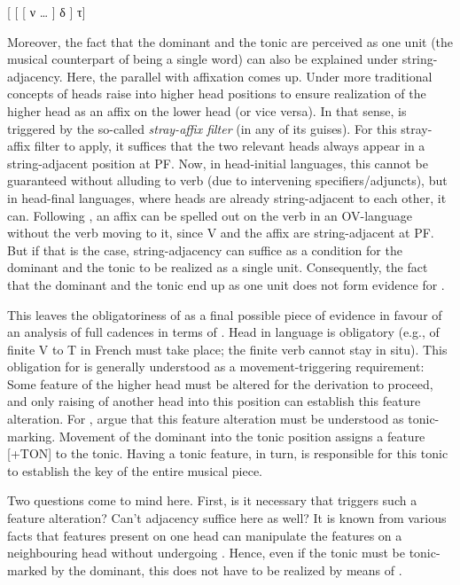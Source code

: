\documentclass[output=paper]{langsci/langscibook}
\begin{document}
\ea\label{bkm:Ref348782802}
    {}[ [ [ ν \dots{} ] δ ] τ]
\z

Moreover, the fact that the dominant and the tonic are perceived as one unit
(the musical counterpart of being a single word) can also be explained under
string-adjacency. Here, the parallel with affixation comes up. Under more
traditional concepts of  heads raise into higher head positions to
ensure realization of the higher head as an affix on the lower head (or vice
versa). In that sense,  is triggered by the so-called
\emph{stray-affix filter} \parencite[cf.][]{Lasnik1981,Lasnik1995b,Baker1988}
(in any of its guises). For this stray-affix filter to apply, it suffices that
the two relevant heads always appear in a string-adjacent position at \gls{PF}.
Now, in head-initial languages, this cannot be guaranteed without alluding to
verb  (due to intervening specifiers/adjuncts), but in head-final
languages, where heads are already string-adjacent to each other, it can.
Following \citet{Bobaljik1995}, an affix can be spelled out on the verb in an
OV-language without the verb moving to it, since V and the affix are
string-adjacent at \gls{PF}.  But if that is the case, string-adjacency can
suffice as a condition for the dominant and the tonic to be realized as a
single unit. Consequently, the fact that the dominant and the tonic end up as
one unit does not form evidence for .

This leaves the obligatoriness of  as a final possible piece of
evidence in favour of an analysis of full cadences in terms of .
Head  in language is obligatory (e.g.,  of finite V to T in
French must take place; the finite verb cannot stay in situ). This obligation
for  is generally understood as a movement-triggering requirement:
Some feature of the higher head must be altered for the derivation to proceed,
and only raising of another head into this position can establish this feature
alteration. For , \citeauthor{KatzPes2011} argue that this feature
alteration must be understood as tonic-marking. Movement of the dominant into
the tonic position assigns a feature [+TON] to the tonic. Having a tonic
feature, in turn, is responsible for this tonic to establish the key of the
entire musical piece.

Two questions come to mind here. First, is it necessary that  triggers
such a feature alteration? Can’t adjacency suffice here as well? It is known
from various  facts that features present on one head can
manipulate the features on a neighbouring head without undergoing .
Hence, even if the tonic must be tonic-marked by the dominant, this does not
have to be realized by means of .
\end{document}
